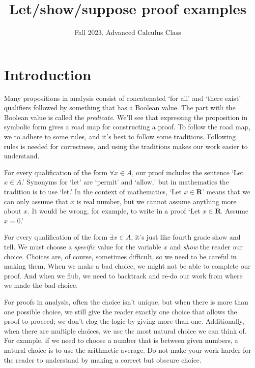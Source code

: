 \documentclass[12pt,fleqn]{article}
\title{Let/show/suppose proof examples}
\author{Fall 2023, Advanced Calculus Class}
\newcommand{\reals}{\mathbf{R}}
\newcounter{ex}\setcounter{ex}{0}
\begin{document}
\maketitle

\section{Introduction}


Many propositions in analysis consist of concatenated `for all' and `there exist'  qualifiers followed by something that has a Boolean value.  
The part with the Boolean value is called the \emph{predicate}. We'll see that expressing the proposition in symbolic 
form gives a road map for constructing  a proof. To follow the road map, we to 
adhere to some rules, and it's best to follow some traditions.  Following rules is 
needed for correctness,  and using the  traditions makes 
 our work easier to understand.

For every qualification of the form $\forall x \in A$, our proof includes the sentence `Let $x \in A$.'  Synonyms  for  `let' 
are `permit' and `allow,' but in mathematics the tradition is to use `let.' In the context of mathematics, `Let $x \in \reals$' means that we can only assume that $x$ is real number, but we cannot assume anything more about $x$. It would be wrong, for example, to write in a proof  
`Let $x \in \reals$. Assume $x = 0$.'

For every qualification of the form $\exists x \in A$, it's just like fourth grade show and tell. We must choose a \emph{specific} value for the 
variable $x$ and \emph{show} the reader our choice. Choices are, of course, sometimes difficult, so we need to be careful in making them. When we make a bad choice, we might not be able to complete our proof. 
And when we flub, we need to backtrack and re-do our work from where
we made the bad choice.

For proofs in analysis, often the choice isn't unique, but when there is more than one possible choice,
we still give the reader exactly one choice that allows the proof to proceed; we don't clog the logic by giving more than one.
Additionally, when there are multiple choices, we use the most natural choice we can think of. For example, if we need to choose a number that is between
given numbers, a natural choice is to use the arithmetic average. Do not make your work harder for the reader to understand 
by making a correct but obscure choice.
\end{document}
